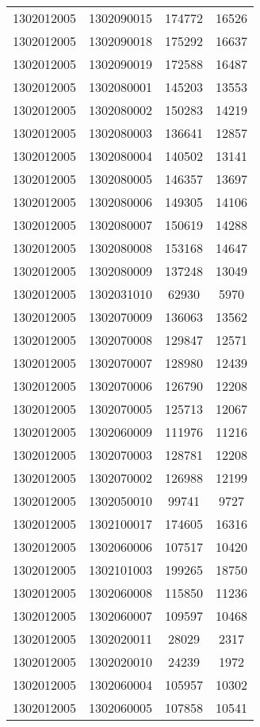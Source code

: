 \begin{longtable}[h]{llcc}
		1302012005 & 1302090015 & 174772 & 16526\\
		1302012005 & 1302090018 & 175292 & 16637\\
		1302012005 & 1302090019 & 172588 & 16487\\
		1302012005 & 1302080001 & 145203 & 13553\\
		1302012005 & 1302080002 & 150283 & 14219\\
		1302012005 & 1302080003 & 136641 & 12857\\
		1302012005 & 1302080004 & 140502 & 13141\\
		1302012005 & 1302080005 & 146357 & 13697\\
		1302012005 & 1302080006 & 149305 & 14106\\
		1302012005 & 1302080007 & 150619 & 14288\\
		1302012005 & 1302080008 & 153168 & 14647\\
		1302012005 & 1302080009 & 137248 & 13049\\
		1302012005 & 1302031010 & 62930 & 5970\\
		1302012005 & 1302070009 & 136063 & 13562\\
		1302012005 & 1302070008 & 129847 & 12571\\
		1302012005 & 1302070007 & 128980 & 12439\\
		1302012005 & 1302070006 & 126790 & 12208\\
		1302012005 & 1302070005 & 125713 & 12067\\
		1302012005 & 1302060009 & 111976 & 11216\\
		1302012005 & 1302070003 & 128781 & 12208\\
		1302012005 & 1302070002 & 126988 & 12199\\
		1302012005 & 1302050010 & 99741 & 9727\\
		1302012005 & 1302100017 & 174605 & 16316\\
		1302012005 & 1302060006 & 107517 & 10420\\
		1302012005 & 1302101003 & 199265 & 18750\\
		1302012005 & 1302060008 & 115850 & 11236\\
		1302012005 & 1302060007 & 109597 & 10468\\
		1302012005 & 1302020011 & 28029 & 2317\\
		1302012005 & 1302020010 & 24239 & 1972\\
		1302012005 & 1302060004 & 105957 & 10302\\
		1302012005 & 1302060005 & 107858 & 10541\\

\end{longtable}
